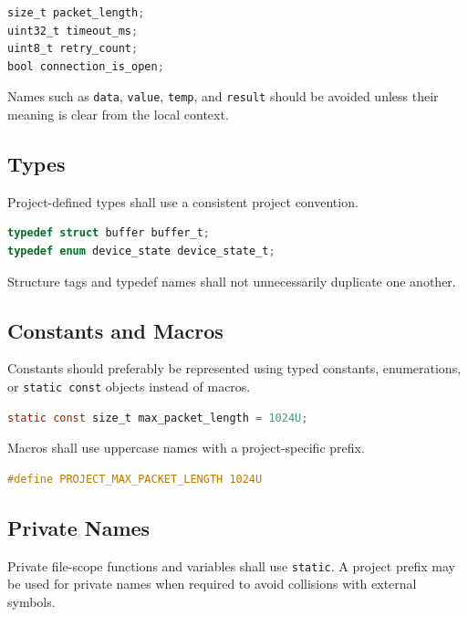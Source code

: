 \begin{lstlisting}[language=C]
size_t packet_length;
uint32_t timeout_ms;
uint8_t retry_count;
bool connection_is_open;
\end{lstlisting}

Names such as \texttt{data}, \texttt{value}, \texttt{temp}, and \texttt{result} should be avoided unless their meaning is clear from the local context.

\subsection{Types}

Project-defined types shall use a consistent project convention.

\begin{lstlisting}[language=C]
typedef struct buffer buffer_t;
typedef enum device_state device_state_t;
\end{lstlisting}

Structure tags and typedef names shall not unnecessarily duplicate one another.

\subsection{Constants and Macros}

Constants should preferably be represented using typed constants, enumerations, or \texttt{static const} objects instead of macros.

\begin{lstlisting}[language=C]
static const size_t max_packet_length = 1024U;
\end{lstlisting}

Macros shall use uppercase names with a project-specific prefix.

\begin{lstlisting}[language=C]
#define PROJECT_MAX_PACKET_LENGTH 1024U
\end{lstlisting}

\subsection{Private Names}

Private file-scope functions and variables shall use \texttt{static}. A project prefix may be used for private names when required to avoid collisions with external symbols.
